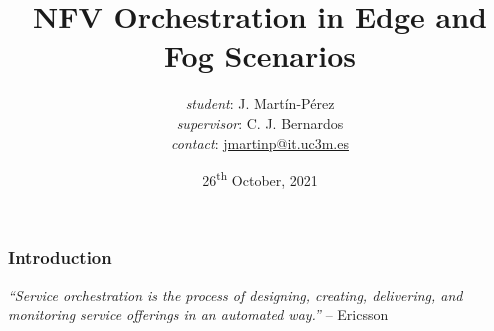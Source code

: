 \documentclass[aspectratio=169]{beamer}
\title{NFV Orchestration in Edge and Fog Scenarios}
\date{26\textsuperscript{th} October, 2021}
\author{
    {\footnotesize \textit{student}}: \! \! \! J. Martín-Pérez\\
    {\footnotesize \textit{supervisor}}: C. J. Bernardos\\
    \vspace{2em}
    \footnotesize{\textit{contact}: \href{mailto:jmartinp@it.uc3m.es}{jmartinp@it.uc3m.es}}
}
\begin{document}
\begin{frame}[plain]
\titlepage
\end{frame}

\setcounter{framenumber}{0}



\begin{frame}
    \frametitle{Introduction}

    \textit{``Service orchestration is the process of designing, creating, delivering, and monitoring service offerings in an automated way.''} -- Ericsson

\end{frame}
\end{document}
